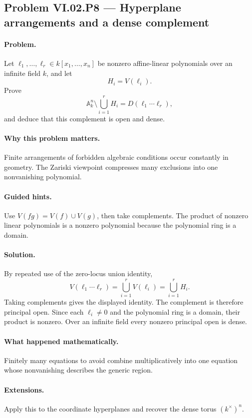 \subsection*{Problem VI.02.P8 --- Hyperplane arrangements and a dense complement}
\label{prob:vi02-p8}

\paragraph{Problem.}
Let \(\ell_1,\dots,\ell_r\in k[x_1,\dots,x_n]\) be nonzero affine-linear polynomials over
an infinite field \(k\), and let
\[
H_i=V(\ell_i).
\]
Prove
\[
\mathbb A_k^n\setminus\bigcup_{i=1}^rH_i
=D(\ell_1\cdots\ell_r),
\]
and deduce that this complement is open and dense.

\ifdefined\FullProblemDossiers
\paragraph{Why this problem matters.}
Finite arrangements of forbidden algebraic conditions occur constantly in geometry.  The
Zariski viewpoint compresses many exclusions into one nonvanishing polynomial.

\paragraph{Guided hints.}
Use \(V(fg)=V(f)\cup V(g)\), then take complements.  The product of nonzero linear
polynomials is a nonzero polynomial because the polynomial ring is a domain.

\paragraph{Solution.}
By repeated use of the zero-locus union identity,
\[
V(\ell_1\cdots\ell_r)=\bigcup_{i=1}^rV(\ell_i)=\bigcup_{i=1}^rH_i.
\]
Taking complements gives the displayed identity.  The complement is therefore principal
open.  Since each \(\ell_i\neq0\) and the polynomial ring is a domain, their product is
nonzero.  Over an infinite field every nonzero principal open is dense.

\paragraph{What happened mathematically.}
Finitely many equations to avoid combine multiplicatively into one equation whose
nonvanishing describes the generic region.

\paragraph{Extensions.}
Apply this to the coordinate hyperplanes and recover the dense torus \((k^\times)^n\).
\fi
